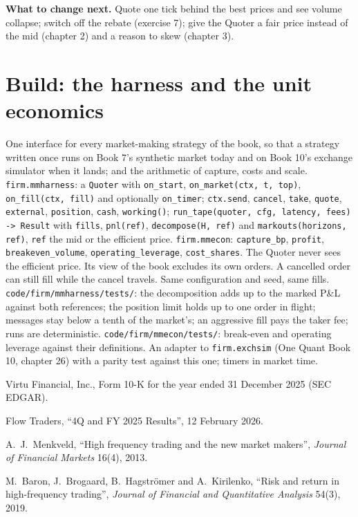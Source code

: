 \textbf{What to change next.} Quote one tick behind the best prices and see volume collapse; switch off the rebate (exercise 7); give the Quoter
a fair price instead of the mid (chapter 2) and a reason to skew (chapter 3).

\section{Build: the harness and the unit economics}\label{bld:hf:the-business-of-market-making:harness}

\begin{build}
 One interface for every market-making strategy of the book, so that a strategy written once runs on Book 7's synthetic market today
and on Book 10's exchange simulator when it lands; and the arithmetic of capture, costs and scale.
 \texttt{firm.mmharness}: a \texttt{Quoter} with \texttt{on\_start}, \texttt{on\_market(ctx, t, top)}, \texttt{on\_fill(ctx, fill)}
and optionally \texttt{on\_timer}; \texttt{ctx.send}, \texttt{cancel}, \texttt{take}, \texttt{quote}, \texttt{external}, \texttt{position},
\texttt{cash}, \texttt{working()}; \texttt{run\_tape(quoter, cfg, latency, fees) -> Result} with \texttt{fills}, \texttt{pnl(ref)},
\texttt{decompose(H, ref)} and \texttt{markouts(horizons, ref)}, \texttt{ref} the mid or the efficient price. \texttt{firm.mmecon}:
\texttt{capture\_bp}, \texttt{profit}, \texttt{breakeven\_volume}, \texttt{operating\_leverage}, \texttt{cost\_shares}.
 The Quoter never sees the efficient price. Its view of the book excludes its own orders. A cancelled order can still fill while the
cancel travels. Same configuration and seed, same fills.
 \texttt{code/firm/mmharness/tests/}: the decomposition adds up to the marked P\&L against both references; the position
limit holds up to one order in flight; messages stay below a tenth of the market's; an aggressive fill pays the taker fee; runs are deterministic.
\texttt{code/firm/mmecon/tests/}: break-even and operating leverage against their definitions.
 An adapter to \texttt{firm.exchsim} (One Quant Book 10, chapter 26) with a parity test against this one; timers in market time.
\end{build}

\begin{omsources}
\item Virtu Financial, Inc., Form 10-K for the year ended 31 December 2025 (SEC EDGAR).
\item Flow Traders, ``4Q and FY 2025 Results'', 12 February 2026.
\item A.~J.~Menkveld, ``High frequency trading and the new market makers'', \emph{Journal of Financial Markets} 16(4), 2013.
\item M.~Baron, J.~Brogaard, B.~Hagströmer and A.~Kirilenko, ``Risk and return in high-frequency trading'', \emph{Journal of Financial and
Quantitative Analysis} 54(3), 2019.
\end{omsources}

